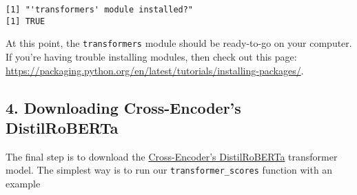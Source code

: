\documentclass[
]{article}
\newenvironment{Shaded}{\begin{snugshade}}{\end{snugshade}}
\newcommand{\AttributeTok}[1]{\textcolor[rgb]{0.77,0.63,0.00}{#1}}
\newcommand{\CommentTok}[1]{\textcolor[rgb]{0.56,0.35,0.01}{\textit{#1}}}
\newcommand{\DecValTok}[1]{\textcolor[rgb]{0.00,0.00,0.81}{#1}}
\newcommand{\FunctionTok}[1]{\textcolor[rgb]{0.00,0.00,0.00}{#1}}
\newcommand{\NormalTok}[1]{#1}
\newcommand{\OtherTok}[1]{\textcolor[rgb]{0.56,0.35,0.01}{#1}}
\newcommand{\SpecialCharTok}[1]{\textcolor[rgb]{0.00,0.00,0.00}{#1}}
\newcommand{\StringTok}[1]{\textcolor[rgb]{0.31,0.60,0.02}{#1}}
\begin{document}
\begin{verbatim}
[1] "'transformers' module installed?"
[1] TRUE
\end{verbatim}

At this point, the \texttt{transformers} module should be ready-to-go on
your computer. If you're having trouble installing modules, then check
out this page:
\url{https://packaging.python.org/en/latest/tutorials/installing-packages/}.

\hypertarget{downloading-cross-encoders-distilroberta}{%
\subsection{4. Downloading Cross-Encoder's
DistilRoBERTa}\label{downloading-cross-encoders-distilroberta}}

The final step is to download the
\href{https://huggingface.co/cross-encoder/nli-distilroberta-base}{Cross-Encoder's DistilRoBERTa}
transformer model. The simplest way is to run our
\texttt{transformer\_scores} function with an example

\begin{Shaded}
\end{Shaded}
\end{document}
